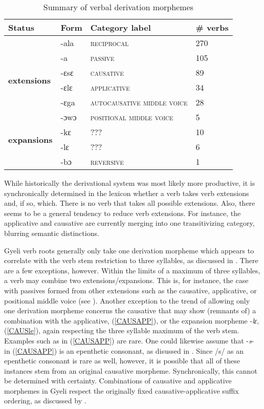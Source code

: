 \begin{table} 
\centering
\begin{tabular}{llll}
Status & Form & Category label & \# verbs \\  \midrule
\multirow{6}{*}{\bfseries extensions} & -ala & {\scshape reciprocal} & 270  \\
& -a & {\scshape passive} & 105 \\
& -ɛsɛ & {\scshape causative} & 89 \\
& -ɛlɛ & {\scshape applicative} & 34 \\
& -ɛga & {\scshape autocausative middle voice} & 28  \\
& -ɔwɔ & {\scshape positional middle voice} & 5 \\  \midrule
\multirow{2}{*}{\bfseries expansions} & -kɛ & {\scshape ???} &  10 \\
 &  -lɛ & {\scshape ???} & 6 \\ 
 & -bɔ & {\scshape reversive} & 1  \\
\end{tabular}
\caption{Summary of verbal derivation morphemes}
\label{Tab:SumVext}
\end{table} 


While historically the derivational system was most likely more productive, it is synchronically determined in the lexicon whether a verb takes verb extensions and, if so, which.  There is no verb that takes all possible extensions. Also, there seems to be a general tendency to reduce verb extensions. For instance, the applicative and causative are currently merging into one transitivizing category, blurring semantic distinctions. 

Gyeli verb roots generally only take one derivation morpheme which appears to correlate with the verb stem restriction to three syllables, as discussed in . There are a few exceptions, however. Within the limits of a maximum of three syllables, a verb may combine two extensions/expansions. This is, for instance, the case with passives formed from other extensions such as the causative, applicative, or positional middle voice (see ). Another exception to the trend of allowing only one derivation morpheme concerns the causative that may show (remnants of) a combination with the applicative, (\ref{CAUSAPP}), or the expansion morpheme -{\itshape lɛ}, (\ref{CAUSle}), again respecting the three syllable maximum of the verb stem. Examples such as in (\ref{CAUSAPP}) are rare. One could likewise assume that  -{\itshape s}- in (\ref{CAUSAPP}) is an epenthetic consonant, as disussed in . Since /s/ as an epenthetic consonant is rare as well, however, it is possible that all of these instances stem from an original causative morpheme. Synchronically, this cannot be determined with certainty. Combinations of causative and applicative morphemes in Gyeli respect the originally fixed causative-applicative suffix ordering, as discussed by \citet{good2005}.


